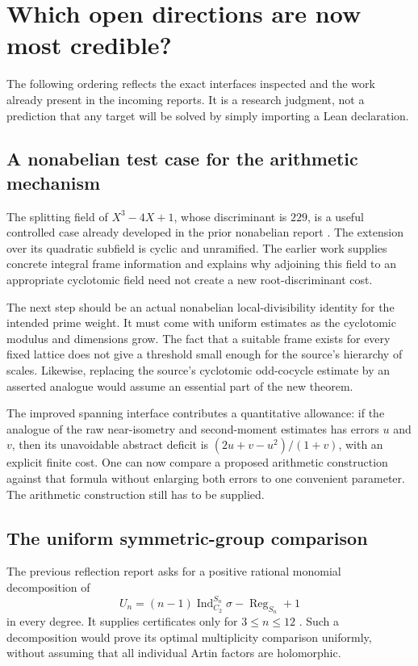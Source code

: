 \section{Which open directions are now most credible?}

The following ordering reflects the exact interfaces inspected and the
work already present in the incoming reports. It is a research judgment,
not a prediction that any target will be solved by simply importing a
Lean declaration.

\subsection{A nonabelian test case for the arithmetic mechanism}

The splitting field of $X^3-4X+1$, whose discriminant is $229$, is a
useful controlled case already developed in the prior nonabelian report
\cite{priornonabelian}. The extension over its quadratic subfield is
cyclic and unramified. The earlier work supplies concrete integral frame
information and explains why adjoining this field to an appropriate
cyclotomic field need not create a new root-discriminant cost.

The next step should be an actual nonabelian local-divisibility identity
for the intended prime weight. It must come with uniform estimates as the
cyclotomic modulus and dimensions grow. The fact that a suitable frame
exists for every fixed lattice does not give a threshold small enough for
the source's hierarchy of scales. Likewise, replacing the source's
cyclotomic odd-cocycle estimate by an asserted analogue would assume an
essential part of the new theorem.

The improved spanning interface contributes a quantitative allowance:
if the analogue of the raw near-isometry and second-moment estimates has
errors $u$ and $v$, then its unavoidable abstract deficit is
$(2u+v-u^2)/(1+v)$, with an explicit finite cost. One can now compare a
proposed arithmetic construction against that formula without enlarging
both errors to one convenient parameter. The arithmetic construction
still has to be supplied.

\subsection{The uniform symmetric-group comparison}

The previous reflection report asks for a positive rational monomial
decomposition of
\[
 U_n=(n-1)\operatorname{Ind}_{C_2}^{S_n}\sigma
       -\operatorname{Reg}_{S_n}+1
\]
in every degree. It supplies certificates only for $3\le n\le12$
\cite{priorreflection}. Such a decomposition would prove its
optimal multiplicity comparison uniformly, without assuming that all
individual Artin factors are holomorphic.

